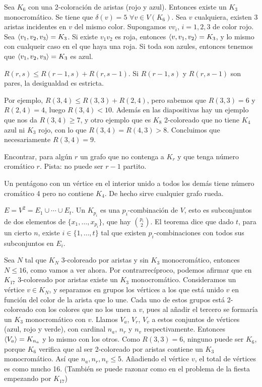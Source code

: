 \documentclass[TGyGC.tex]{subfiles}
\begin{document}
\begin{ej}
Sea $K_6$ con una 2-coloración de aristas (rojo y azul). Entonces existe un $K_3$ monocromático. Se tiene que $\delta(v)=5$ $\forall v\in V(K_6)$. Sea $v$ cualquiera, existen 3 aristas incidentes en $v$ del mismo color. Supongamos $vv_i$, $i=1,2,3$ de color rojo. Sea $\langle{v_1,v_2,v_3}\rangle=K_3$. Si existe $v_1v_2$ es roja, entonces $\langle{v,v_1, v_2}\rangle=K_3$, y lo mismo con cualqueir caso en el que haya una roja. Si toda son azules, entonces tenemos que $\langle{v_1,v_2,v_3}\rangle=K_3$ es azul.  
\end{ej}

\begin{teorema}
$R(r,s)\leq R(r-1,s)+R(r,s-1)$. Si $R(r-1,s)$ y $R(r,s-1)$ son pares, la desigualdad es estricta. 
\end{teorema}

Por ejemplo, $R(3,4)\leq R(3,3)+R(2,4)$, pero sabemos que $R(3,3)=6$ y $R(2,4)=4$, luego $R(3,4)<10$. Además en las diapositivas hay un ejemplo que nos da $R(3,4)\geq 7$, y otro ejemplo que es $K_8$ 2-coloreado que no tiene $K_4$ azul ni $K_3$ rojo, con lo que $R(3,4)=R(4,3)>8$. Concluimos que necesariamente $R(3,4)=9$. 

\begin{ejer}
Encontrar, para algún $r$ un grafo que no contenga a $K_r$ y que tenga número cromático $r$. Pista: no puede ser $r-1$ partito. 
\end{ejer}
Un pentágono con un vértice en el interior unido a todos los demás tiene número cromático 4 pero no contiene $K_4$. De hecho sirve cualquier grafo rueda.

\begin{teorema}
$E=V^2=E_1\cup\cdots\cup E_t$. Un $K_{p_i}$ es una $p_i$-combinación de $V$, esto es subconjuntos de dos elementos de $\{x_1,\dots, x_{p_i}\}$, que hay $\binom{p_i}{2}$. El teorema dice que dado $t$, para un cierto $n$, existe $i\in\{1,\dots, t\}$ tal que existen $p_i$-combinaciones con todos sus subconjuntos en $E_i$.
\end{teorema}


Sea $N$ tal que $K_N$ 3-coloreado por aristas y sin $K_3$ monocromático, entonces $N\leq 16$, como vamos a ver ahora. Por contrarrecíproco, podemos afirmar que en $K_{17}$ 3-coloreado por aristas existe un $K_3$ monocromático. Consideramos un vértice $v\in K_N$, y separamos en grupos los vértices a los que está unido $v$ en función del color de la arista que lo une. Cada uno de estos grupos está 2-coloreado con los colores que no los unen a $v$, pues al añadir el tercero se formaría un $K_3$ monocromático con $v$. Llamos $V_a$, $V_r$, $V_v$ a estos conjuntos de vértices (azul, rojo y verde), con cardinal $n_a$, $n_r$ y $n_v$ respectivamente. Entonces $\langle{V_a}\rangle=K_{n_a}$ y lo mismo con los otros. Como $R(3,3)=6$, ninguno puede ser $K_6$, porque $K_6$ verifica que al ser 2-coloreado por aristas contiene un $K_3$ monocromático. Así que $n_a,n_r,n_v\leq 5$. Añadiendo el vértice $v$, el total de vértices es como mucho 16. (También se puede razonar como en el problema de la fiesta empezando por $K_{17}$)
\end{document}
